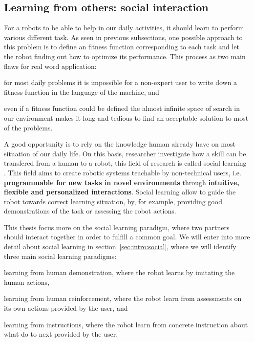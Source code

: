 \subsection{Learning from others: social interaction}
\label{sec:intro:paradigms:social}

For a robots to be able to help in our daily activities, it should learn to perform various different task. As seen in previous subsections, one possible approach to this problem is to define an fitness function corresponding to each task and let the robot finding out how to optimize its performance. This process as two main flaws for real word application: \begin{inparaenum}[(a)] \item for most daily problems it is impossible for a non-expert user to write down a fitness function in the language of the machine, and \item even if a fitness function could be defined the almost infinite space of search in our environment makes it long and tedious to find an acceptable solution to most of the problems. \end{inparaenum} 

A good opportunity is to rely on the knowledge human already have on most situation of our daily life. On this basis, researcher investigate how a skill can be transfered from a human to a robot, this field of research is called social learning \cite{nehaniv2007imitation}. This field aims to create robotic systems teachable by non-technical users, i.e. \textbf{programmable for new tasks in novel environments} through \textbf{intuitive, flexible and personalized interactions}. Social learning allow to guide the robot towards correct learning situation, by, for example, providing good demonstrations of the task or assessing the robot actions.

This thesis focus more on the social learning paradigm, where two partners should interact together in order to fulfill a common goal. We will enter into more detail about social learning in section~\ref{sec:intro:social}, where we will identify three main social learning paradigms: \begin{inparaenum}[(a)] \item learning from human demonstration, where the robot learns by imitating the human actions, \item learning from human reinforcement, where the robot learn from assessments on its own actions provided by the user, and \item learning from instructions, where the robot learn from concrete instruction about what do to next provided by the user. \end{inparaenum}

